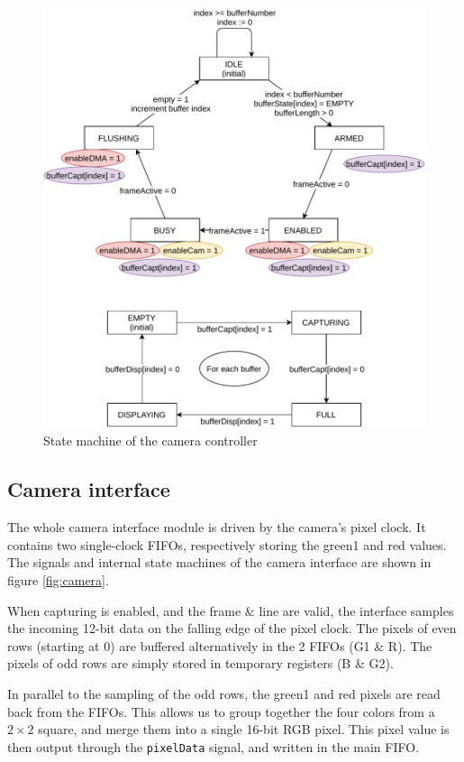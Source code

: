 \documentclass[12pt,a4paper]{article}
\begin{document}
\begin{figure}[p]
	\centering
	\includegraphics[width=\textwidth]{figures/syssm}
	\caption{State machine of the camera controller}
	\label{fig:syssm}
\end{figure}

\subsection{Camera interface}

The whole camera interface module is driven by the camera's pixel clock. It contains two single-clock FIFOs, respectively storing the green1 and red values. The signals and internal state machines of the camera interface are shown in figure \ref{fig:camera}.

When capturing is enabled, and the frame \& line are valid, the interface samples the incoming 12-bit data on the falling edge of the pixel clock. The pixels of even rows (starting at 0) are buffered alternatively in the 2 FIFOs (G1 \& R). The pixels of odd rows are simply stored in temporary registers (B \& G2).

In parallel to the sampling of the odd rows, the green1 and red pixels are read back from the FIFOs. This allows us to group together the four colors from a $2\times 2$ square, and merge them into a single 16-bit RGB pixel. This pixel value is then output through the \texttt{pixelData} signal, and written in the main FIFO.
\end{document}

